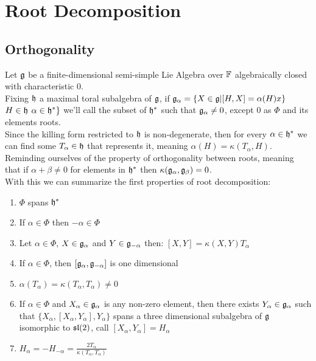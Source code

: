 \section{Root Decomposition}
\subsection*{Orthogonality}
Let $\mathfrak{g}$ be a finite-dimensional semi-simple Lie Algebra over $\mathbb{F}$ algebraically closed with characteristic $0$.\\
Fixing $\mathfrak{h}$ a maximal toral subalgebra of $\mathfrak{g}$, if $\mathfrak{g}_\alpha = \{X \in \mathfrak{g} | [H,X]=\alpha(H)x\}$  $H \in \mathfrak{h}$  $\alpha \in \mathfrak{h}^*\}$ we'll call the subset of $\mathfrak{h}^*$ such that $\mathfrak{g}_\alpha \not=0$, except $0$ as $\Phi$ and its elements roots. \\
Since the killing form restricted to $\mathfrak{h}$ is non-degenerate, then for every $\alpha \in \mathfrak{h}^*$ we can find some $T_\alpha \in \mathfrak{h}$ that represents it, meaning $\alpha(H)=\kappa(T_\alpha,H)$.\\
Reminding ourselves of the property of orthogonality between roots, meaning that if $\alpha+\beta \not=0$ for elements in $\mathfrak{h}^*$ then $\kappa(\mathfrak{g}_\alpha,\mathfrak{g}_\beta)=0$.\\
With this we can summarize the first properties of root decomposition:
\begin{prop}
	\begin{enumerate}[label=(\alph*)]
		\item $\Phi$ spans $\mathfrak{h}^*$
		\item If $\alpha \in \Phi$ then $-\alpha \in \Phi$
		\item Let $\alpha \in \Phi$, $X \in \mathfrak{g}_\alpha$ and $Y \in \mathfrak{g}_{-\alpha}$ then: $[X,Y]=\kappa(X,Y)T_\alpha$
		\item If $\alpha \in \Phi$, then $[\mathfrak{g}_\alpha,\mathfrak{g}_{-\alpha}]$ is one dimensional
		\item $\alpha(T_\alpha)=\kappa(T_\alpha,T_\alpha)\not=0$
		\item If $\alpha \in \Phi$ and $X_\alpha \in \mathfrak{g}_\alpha$ is any non-zero element, then there exists $Y_\alpha \in \mathfrak{g}_\alpha$ such that $\{X_\alpha,[X_\alpha,Y_\alpha],Y_\alpha\}$ spans a three dimensional subalgebra of $\mathfrak{g}$ isomorphic to $\mathfrak{sl}(2)$, call $[X_\alpha,Y_\alpha]=H_\alpha$
		\item $H_\alpha = -H_{-\alpha} = \frac{2T_\alpha}{\kappa(T_\alpha,T_\alpha)}$ 
	\end{enumerate}
	\label{Orthogonality}
\end{prop}
